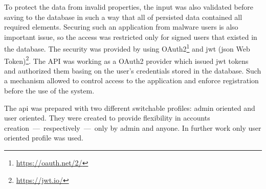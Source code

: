 To protect the data from invalid properties, the input was also validated before saving to the database in such a way that all of persisted data contained all required elements.
Securing such an application from malware users is also important issue, so the access was restricted only for signed users that existed in the database.
The security was provided by using OAuth2\footnote{\url{https://oauth.net/2/}} and \gls{jwt} (\gls{json} Web Token)\footnote{\url{https://jwt.io/}}.
The API was working as a OAuth2 provider which issued \gls{jwt} tokens and authorized them basing on the user's credentials stored in the database.
Such a mechanism allowed to control access to the application and enforce registration before the use of the system.

The \gls{api} was prepared with two different switchable profiles: admin oriented and user oriented.
They were created to provide flexibility in accounts creation~---~respectively~---~only by admin and anyone.
In further work only user oriented profile was used.